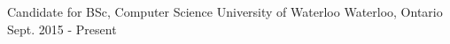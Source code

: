 


\vspace{0.5ex}


\begin{cventries}


\shortcventry                                                                                                                                                                                                                                                                                                                                                                                                                                                                                                                                                                                                                                                                                                                                                                                                                                                                                                                                                                                                                                                                                                                                                                                                                                                                                                                                                                                                                                                                                                                                                                                                                                                                                                                                                                                                                                                                                                                                                                                
{Candidate for BSc, Computer Science } %
{University of Waterloo} %
{Waterloo, Ontario} %
{Sept. 2015 - Present} %


\end{cventries}
